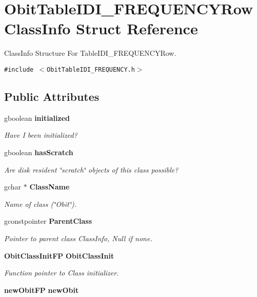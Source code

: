 \section{Obit\-Table\-IDI\_\-FREQUENCYRow\-Class\-Info Struct Reference}
\label{structObitTableIDI__FREQUENCYRowClassInfo}
Class\-Info Structure For Table\-IDI\_\-FREQUENCYRow.  


{\tt \#include $<$Obit\-Table\-IDI\_\-FREQUENCY.h$>$}

\subsection*{Public Attributes}
\begin{CompactItemize}
\item 
gboolean {\bf initialized}
\begin{CompactList}\small\item\em Have I been initialized? \item\end{CompactList}\item 
gboolean {\bf has\-Scratch}
\begin{CompactList}\small\item\em Are disk resident \char`\"{}scratch\char`\"{} objects of this class possible? \item\end{CompactList}\item 
gchar $\ast$ {\bf Class\-Name}
\begin{CompactList}\small\item\em Name of class (\char`\"{}Obit\char`\"{}). \item\end{CompactList}\item 
gconstpointer {\bf Parent\-Class}
\begin{CompactList}\small\item\em Pointer to parent class Class\-Info, Null if none. \item\end{CompactList}\item 
{\bf Obit\-Class\-Init\-FP} {\bf Obit\-Class\-Init}
\begin{CompactList}\small\item\em Function pointer to Class initializer. \item\end{CompactList}\item 
{\bf new\-Obit\-FP} {\bf new\-Obit}

\end{CompactItemize}
